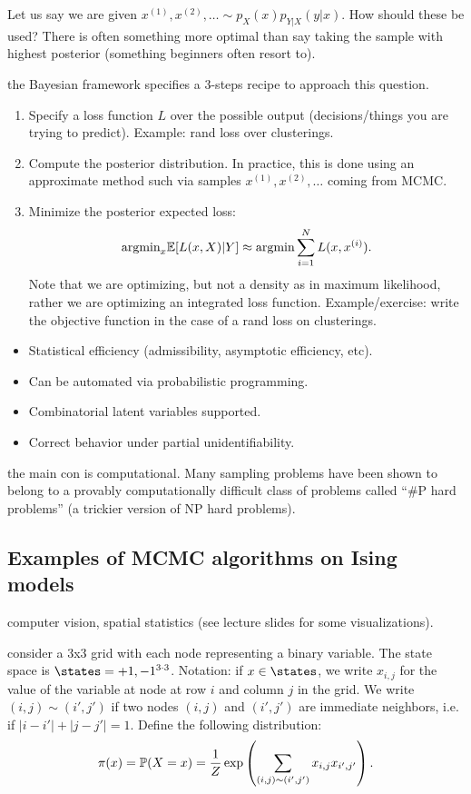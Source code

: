 \documentclass{article}
\begin{document}
Let us say we are given $x^{(1)}, x^{(2)}, \dots \sim p_X(x) p_{Y|X}(y|x)$. How should these be used? There is often something more optimal than say taking the sample with highest posterior (something beginners often resort to). 

 the Bayesian framework specifies a 3-steps recipe to approach this question.
\begin{enumerate}
  \item Specify a loss function $L$ over the possible output (decisions/things you are trying to predict). Example: rand loss over clusterings.
  \item Compute the posterior distribution. In practice, this is done using an approximate method such via samples $x^{(1)}, x^{(2)}, \dots$ coming from MCMC.
  \item Minimize the posterior expected loss:
\[ \text{argmin}_x \E[L(x, X)|Y] \approx \text{argmin} \sum_{i=1}^N L(x, x^{(i)}). \] Note that we are optimizing, but not a density as in maximum likelihood, rather we are optimizing an integrated loss function. Example/exercise: write the objective function in the case of a rand loss on clusterings.
\end{enumerate}

\begin{itemize}
  \item Statistical efficiency (admissibility, asymptotic efficiency, etc).
  \item Can be automated via probabilistic programming.
  \item Combinatorial latent variables supported.
  \item Correct behavior under partial unidentifiability.
\end{itemize}

 the main con is computational. Many sampling problems have been shown to belong to a provably computationally difficult class of problems called ``\#P hard problems'' (a trickier version of NP hard problems). 


\subsection{Examples of MCMC algorithms on Ising models}

 computer vision, spatial statistics (see lecture slides for some visualizations).

 consider a 3x3 grid with each node representing a binary variable. The state space is $\states = {+1, -1}^{3\cdot 3}$. Notation: if $x \in \states$, we write $x_{i,j}$ for the value of the variable at node at row $i$ and column $j$ in the grid. We write $(i,j) \sim (i',j')$ if two nodes $(i,j)$ and $(i',j')$ are immediate neighbors, i.e. if $|i-i'| + |j-j'| = 1$. Define the following distribution:
\begin{equation}\label{eq:target}
\pi(x) = \P(X = x) = \frac{1}{Z} \exp\left( \sum_{(i,j)\sim(i',j')} x_{i,j} x_{i',j'} \right).
\end{equation}
\end{document}
